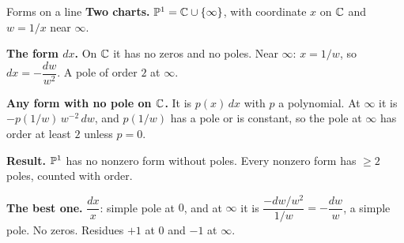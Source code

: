 \begin{frame}{Forms on a line}
\textbf{Two charts.} \(\mathbb P^1=\mathbb C\cup\{\infty\}\), with coordinate \(x\) on \(\mathbb C\) and \(w=1/x\) near \(\infty\).
\par\medskip
\textbf{The form \(dx\).} On \(\mathbb C\) it has no zeros and no poles. Near \(\infty\): \(x=1/w\), so \(dx=-\dfrac{dw}{w^{2}}\). A pole of order \(2\) at \(\infty\).
\par\medskip
\textbf{Any form with no pole on \(\mathbb C\).} It is \(p(x)\,dx\) with \(p\) a polynomial. At \(\infty\) it is \(-p(1/w)\,w^{-2}\,dw\), and \(p(1/w)\) has a pole or is constant, so the pole at \(\infty\) has order at least \(2\) unless \(p=0\).
\par\medskip
\textbf{Result.} \(\mathbb P^1\) has no nonzero form without poles. Every nonzero form has \(\ge 2\) poles, counted with order.
\par\medskip
\textbf{The best one.} \(\dfrac{dx}{x}\): simple pole at \(0\), and at \(\infty\) it is \(\dfrac{-dw/w^{2}}{1/w}=-\dfrac{dw}{w}\), a simple pole. No zeros. Residues \(+1\) at \(0\) and \(-1\) at \(\infty\).
\end{frame}

